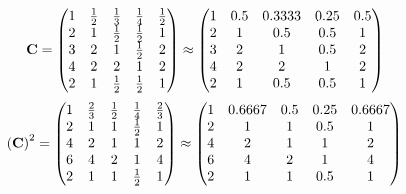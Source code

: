 \documentclass[10pt,a4paper]{article}
\begin{document}
	\[
		\bold{C} = 
		\begin{pmatrix}
			{1} {} & \frac{1} {{2}} & \frac{1} {{3}} & \frac{1} {{4}} & \frac{1} {{2}} \\
			{{2}} {} & {1} {} & \frac{1} {{2}} & \frac{1} {{2}} & {1} {} \\
			{{3}} {} & {{2}} {} & {1} {} & \frac{1} {{2}} & {{2}} {} \\
			{{4}} {} & {{2}} {} & {{2}} {} & {1} {} & {{2}} {} \\
			{{2}} {} & {1} {} & \frac{1} {{2}} & \frac{1} {{2}} & {1} {} \\
		\end{pmatrix}
		\approx
		\begin{pmatrix}
			1        & 0.5      & 0.3333   & 0.25     & 0.5      \\
			2        & 1        & 0.5      & 0.5      & 1        \\
			3        & 2        & 1        & 0.5      & 2        \\
			4        & 2        & 2        & 1        & 2        \\
			2        & 1        & 0.5      & 0.5      & 1        \\
		\end{pmatrix}
	\]
	\[
		\left(\bold{C}\right)^{2} = 
		\begin{pmatrix}
			{1} {} & \frac{{2}} {{3}} & \frac{1} {{2}} & \frac{1} {{4}} & \frac{{2}} {{3}} \\
			{{2}} {} & {1} {} & {1} {} & \frac{1} {{2}} & {1} {} \\
			{{4}} {} & {{2}} {} & {1} {} & {1} {} & {{2}} {} \\
			{{6}} {} & {{4}} {} & {{2}} {} & {1} {} & {{4}} {} \\
			{{2}} {} & {1} {} & {1} {} & \frac{1} {{2}} & {1} {} \\
		\end{pmatrix}
		\approx
		\begin{pmatrix}
			1        & 0.6667   & 0.5      & 0.25     & 0.6667   \\
			2        & 1        & 1        & 0.5      & 1        \\
			4        & 2        & 1        & 1        & 2        \\
			6        & 4        & 2        & 1        & 4        \\
			2        & 1        & 1        & 0.5      & 1        \\
		\end{pmatrix}
	\]
\end{document}
